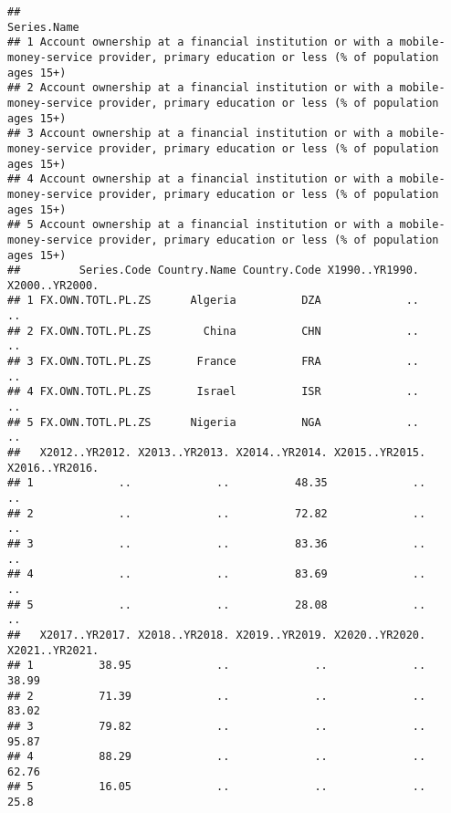 \documentclass[
]{article}
\begin{document}
\begin{verbatim}
##                                                                                                                                  Series.Name
## 1 Account ownership at a financial institution or with a mobile-money-service provider, primary education or less (% of population ages 15+)
## 2 Account ownership at a financial institution or with a mobile-money-service provider, primary education or less (% of population ages 15+)
## 3 Account ownership at a financial institution or with a mobile-money-service provider, primary education or less (% of population ages 15+)
## 4 Account ownership at a financial institution or with a mobile-money-service provider, primary education or less (% of population ages 15+)
## 5 Account ownership at a financial institution or with a mobile-money-service provider, primary education or less (% of population ages 15+)
##         Series.Code Country.Name Country.Code X1990..YR1990. X2000..YR2000.
## 1 FX.OWN.TOTL.PL.ZS      Algeria          DZA             ..             ..
## 2 FX.OWN.TOTL.PL.ZS        China          CHN             ..             ..
## 3 FX.OWN.TOTL.PL.ZS       France          FRA             ..             ..
## 4 FX.OWN.TOTL.PL.ZS       Israel          ISR             ..             ..
## 5 FX.OWN.TOTL.PL.ZS      Nigeria          NGA             ..             ..
##   X2012..YR2012. X2013..YR2013. X2014..YR2014. X2015..YR2015. X2016..YR2016.
## 1             ..             ..          48.35             ..             ..
## 2             ..             ..          72.82             ..             ..
## 3             ..             ..          83.36             ..             ..
## 4             ..             ..          83.69             ..             ..
## 5             ..             ..          28.08             ..             ..
##   X2017..YR2017. X2018..YR2018. X2019..YR2019. X2020..YR2020. X2021..YR2021.
## 1          38.95             ..             ..             ..          38.99
## 2          71.39             ..             ..             ..          83.02
## 3          79.82             ..             ..             ..          95.87
## 4          88.29             ..             ..             ..          62.76
## 5          16.05             ..             ..             ..           25.8
\end{verbatim}
\end{document}
